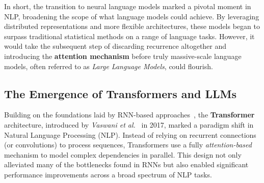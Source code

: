 \noindent
In short, the transition to neural language models marked a pivotal moment in NLP, broadening the scope of what language models could achieve. By leveraging distributed representations and more flexible architectures, these models began to surpass traditional statistical methods on a range of language tasks. However, it would take the subsequent step of discarding recurrence altogether and introducing the \textbf{attention mechanism} before truly massive-scale language models, often referred to as \textit{Large Language Models}, could flourish.

\subsection{The Emergence of Transformers and LLMs}
\label{sec:transformers_llms}

\noindent
Building on the foundations laid by RNN-based approaches~\cite{hochreiter1997long}, the \textbf{Transformer} architecture, introduced by \emph{Vaswani et al.}~\cite{vaswani2017attention} in 2017, marked a paradigm shift in Natural Language Processing (NLP). Instead of relying on recurrent connections (or convolutions) to process sequences, Transformers use a fully \emph{attention-based} mechanism to model complex dependencies in parallel. This design not only alleviated many of the bottlenecks found in RNNs but also enabled significant performance improvements across a broad spectrum of NLP tasks.

